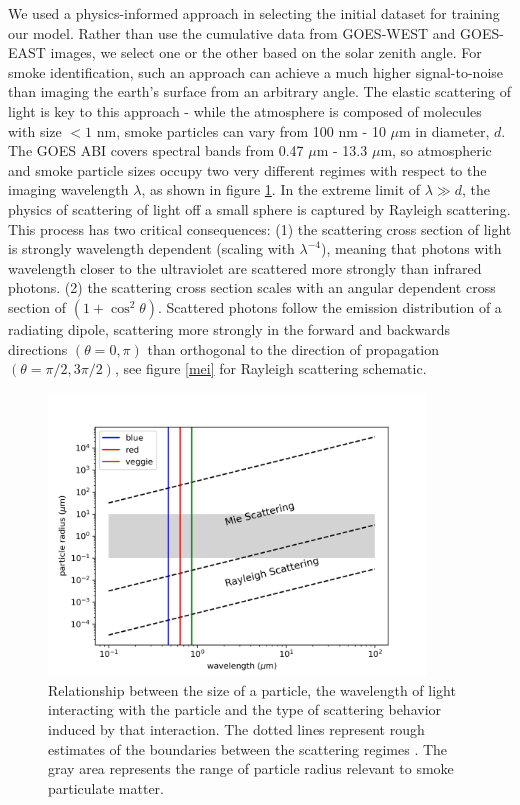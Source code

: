 \documentclass{ametsocV6.1}
\begin{document}
We used a physics-informed approach in selecting the initial dataset for training our model. Rather than use the cumulative data from GOES-WEST and GOES-EAST images, we select one or the other based on the solar zenith angle. For smoke identification, such an approach can achieve a much higher signal-to-noise than imaging the earth’s surface from an arbitrary angle. The elastic scattering of light is key to this approach - while the atmosphere is composed of molecules with size $<1$ nm, smoke particles can vary from 100 nm - 10 $\mu$m in diameter, $d$. The GOES ABI covers spectral bands from 0.47 $\mu$m - 13.3 $\mu$m, so atmospheric and smoke particle sizes occupy two very different regimes with respect to the imaging wavelength $\lambda$, as shown in figure \ref{regime}. In the extreme limit of $\lambda \gg d$, the physics of scattering of light off a small sphere is captured by Rayleigh scattering. This process has two critical consequences: (1) the scattering cross section of light is strongly wavelength dependent (scaling with $\lambda^{-4}$), meaning that photons with wavelength closer to the ultraviolet are scattered more strongly than infrared photons. (2) the scattering cross section scales with an angular dependent cross section of $(1 + \cos^2 \theta)$. Scattered photons follow the emission distribution of a radiating dipole, scattering more strongly in the forward and backwards directions $(\theta = 0,\pi)$ than orthogonal to the direction of propagation $(\theta = \pi/2, 3\pi/2)$, see figure \ref{mei} for Rayleigh scattering schematic.

\begin{figure}
    \centering
    \includegraphics[width=10cm]{figures/scatter_regime.png}
    \caption{Relationship between the size of a particle, the wavelength of light interacting with the particle and the type of scattering behavior induced by that interaction. The dotted lines represent rough estimates of the boundaries between the scattering regimes \citep{petty}. The gray area represents the range of particle radius relevant to smoke particulate matter.}\label{regime}
\end{figure}
\end{document}
